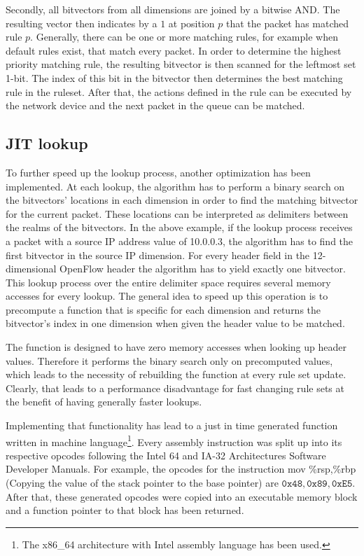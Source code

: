 \documentclass[a4paper,
		12pt,
		parskip=full,
		titlepage
		]{scrartcl}
\begin{document}
Secondly, all bitvectors from all dimensions are joined by a bitwise AND.
The resulting vector then indicates by a $1$ at position $p$ that the packet has matched rule $p$.
Generally, there can be one or more matching rules, for example when default rules exist, that match every packet.
In order to determine the highest priority matching rule, the resulting bitvector is then scanned for the leftmost set 1-bit.
The index of this bit in the bitvector then determines the best matching rule in the ruleset.
After that, the actions defined in the rule can be executed by the network device and the next packet in the queue can be matched.

\subsection{JIT lookup}
To further speed up the lookup process, another optimization has been implemented.
At each lookup, the algorithm has to perform a binary search on the bitvectors' locations in each dimension in order to find the matching bitvector for the current packet.
These locations can be interpreted as delimiters between the realms of the bitvectors.
In the above example, if the lookup process receives a packet with a source IP address value of 10.0.0.3, the algorithm has to find the first bitvector in the source IP dimension. %
For every header field in the 12-dimensional OpenFlow header the algorithm has to yield exactly one bitvector.
This lookup process over the entire delimiter space requires several memory accesses for every lookup.
The general idea to speed up this operation is to precompute a function that is specific for each dimension and returns the bitvector's index in one dimension when given the header value to be matched.

The function is designed to have zero memory accesses when looking up header values.
Therefore it performs the binary search only on precomputed values, which 
leads to the necessity of rebuilding the function at every rule set update.
Clearly, that leads to a performance disadvantage for fast changing rule sets at the benefit of having generally faster lookups.

Implementing that functionality has lead to a just in time generated function written in machine 
language\footnote{The x86\_64 architecture with Intel assembly language has been used.}.
Every assembly instruction was split up into its respective opcodes following the 
Intel 64 and IA-32 Architectures Software Developer Manuals.
For example, the opcodes for the instruction 
\textsf{mov \%rsp,\%rbp} (Copying the value of the stack pointer to the base pointer) 
are $\texttt{0x48}, \texttt{0x89}, \texttt{0xE5}$.
After that, these generated opcodes were copied into an executable memory block and a function pointer to that block has been returned.
\end{document}
